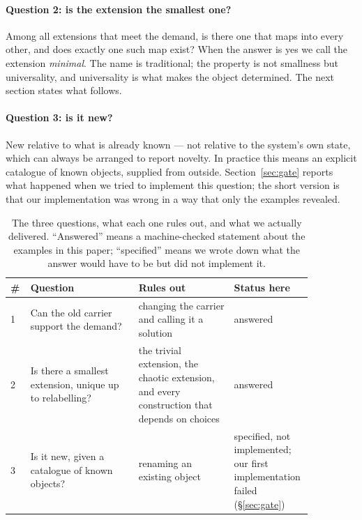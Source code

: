 \documentclass[aps,prd,preprint,superscriptaddress,amsmath,amssymb]{revtex4-2}
\begin{document}
\paragraph{Question 2: is the extension the smallest one?}
Among all extensions that meet the demand, is there one that maps into every
other, and does exactly one such map exist?  When the answer is yes we call the
extension \emph{minimal}.  The name is traditional; the property is not
smallness but universality, and universality is what makes the object determined.
The next section states what follows.

\paragraph{Question 3: is it new?}
New relative to what is already known --- not relative to the system's own state,
which can always be arranged to report novelty.  In practice this means an
explicit catalogue of known objects, supplied from outside.  Section~\ref{sec:gate}
reports what happened when we tried to implement this question; the short version
is that our implementation was wrong in a way that only the examples revealed.

\begin{table}[t]
\caption{The three questions, what each one rules out, and what we actually
delivered.  ``Answered'' means a machine-checked statement about the examples in
this paper; ``specified'' means we wrote down what the answer would have to be but
did not implement it.}
\label{tab:three}
\begin{ruledtabular}
\begin{tabular}{p{0.06\linewidth}p{0.34\linewidth}p{0.3\linewidth}p{0.16\linewidth}}
\# & Question & Rules out & Status here \\
\hline
1 & Can the old carrier support the demand? & changing the carrier and calling it a solution & answered \\
2 & Is there a smallest extension, unique up to relabelling? & the trivial extension, the chaotic extension, and every construction that depends on choices & answered \\
3 & Is it new, given a catalogue of known objects? & renaming an existing object & specified, not implemented; our first implementation failed (\S\ref{sec:gate}) \\
\end{tabular}
\end{ruledtabular}
\end{table}
\end{document}
